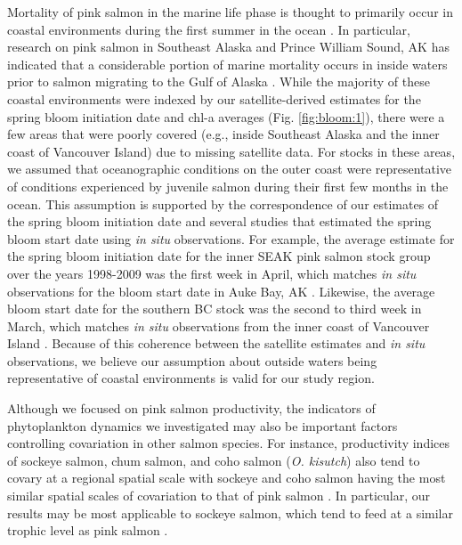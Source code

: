 Mortality of pink salmon in the marine life phase is thought to primarily occur
in coastal environments during the first summer in the ocean \citep{Farley2007a,
Parker1968a, Wertheimer2007a}. In particular, research on pink salmon in
Southeast Alaska and Prince William Sound, AK has indicated that a considerable
portion of marine mortality occurs in inside waters prior to salmon migrating to
the Gulf of Alaska \citep{Orsi2013, Farley2007a}. While the majority of these
coastal environments were indexed by our satellite-derived estimates for the
spring bloom initiation date and chl-a averages (Fig. \ref{fig:bloom:1}), there
were a few areas that were poorly covered (e.g., inside Southeast Alaska and the
inner coast of Vancouver Island) due to missing satellite data. For stocks in
these areas, we assumed that oceanographic conditions on the outer coast were
representative of conditions experienced by juvenile salmon during their first
few months in the ocean. This assumption is supported by the correspondence of
our estimates of the spring bloom initiation date and several studies that
estimated the spring bloom start date using \emph{in situ} observations. For
example, the average estimate for the spring bloom initiation date for the inner
SEAK pink salmon stock group over the years 1998-2009 was the first week in
April, which matches \emph{in situ} observations for the bloom start date in
Auke Bay, AK \citep{Ziemann1991}. Likewise, the average bloom start date for the
southern BC stock was the second to third week in March, which matches \emph{in
situ} observations from the inner coast of Vancouver Island
\citep{Chittenden2010a}.  Because of this coherence between the satellite
estimates and \emph{in situ} observations, we believe our assumption about
outside waters being representative of coastal environments is valid for our
study region.

Although we focused on pink salmon productivity, the indicators of phytoplankton
dynamics we investigated may also be important factors controlling covariation
in other salmon species. For instance, productivity indices of sockeye salmon,
chum salmon, and coho salmon (\emph{O. kisutch}) also tend to covary at a
regional spatial scale with sockeye and coho salmon having the most similar
spatial scales of covariation to that of pink salmon \citep{Mueter2002b,
Teo2009a, Peterman2012}. In particular, our results may be most applicable to
sockeye salmon, which tend to feed at a similar trophic level as pink salmon
\citep{Johnson2009a}.


